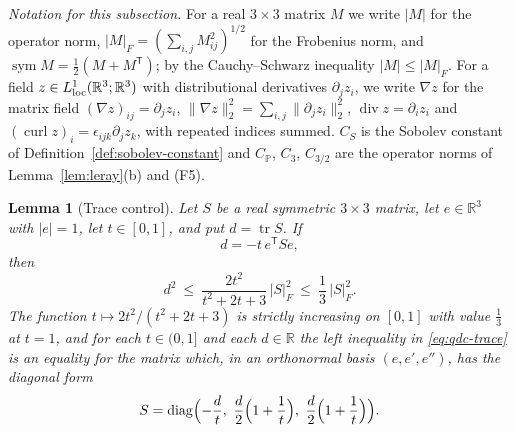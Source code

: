 \documentclass[11pt]{article}
\newtheorem{lemma}[theorem]{Lemma}
\theoremstyle{definition}
\theoremstyle{plain}
\newcommand{\R}{\mathbb R}
\newcommand{\norm}[1]{\lVert #1\rVert}
\begin{document}
\emph{Notation for this subsection.}  For a real $3\times3$ matrix $M$ we
write $|M|$ for the operator norm, $|M|_F=(\sum_{i,j}M_{ij}^2)^{1/2}$ for
the Frobenius norm, and $\operatorname{sym}M=\frac12(M+M^{\mathsf T})$; by
the Cauchy--Schwarz inequality $|M|\le|M|_F$.  For a field
$z\in L^1_{\rm loc}(\R^3;\R^3)$ with distributional derivatives
$\partial_jz_i$, we write $\nabla z$ for the matrix field
$(\nabla z)_{ij}=\partial_jz_i$,
$\norm{\nabla z}_2^2=\sum_{i,j}\norm{\partial_jz_i}_2^2$,
$\operatorname{div}z=\partial_iz_i$ and
$(\operatorname{curl}z)_i=\epsilon_{ijk}\partial_jz_k$, with repeated
indices summed.  $C_S$ is the Sobolev constant of
Definition~\ref{def:sobolev-constant} and $C_{\mathbb P}$, $C_3$, $C_{3/2}$
are the operator norms of Lemma~\ref{lem:leray}(b) and (F5).

\begin{lemma}[Trace control]\label{lem:trace-control}
Let $S$ be a real symmetric $3\times3$ matrix, let $e\in\R^3$ with $|e|=1$,
let $t\in[0,1]$, and put $d=\operatorname{tr}S$.  If
\begin{equation}\label{eq:qdc-constraint}
 d=-t\,e^{\mathsf T}Se ,
\end{equation}
then
\begin{equation}\label{eq:qdc-trace}
 d^2\ \le\ \frac{2t^2}{t^2+2t+3}\,|S|_F^2\ \le\ \frac13\,|S|_F^2 .
\end{equation}
The function $t\mapsto2t^2/(t^2+2t+3)$ is strictly increasing on $[0,1]$
with value $\frac13$ at $t=1$, and for each $t\in(0,1]$ and each $d\in\R$
the left inequality in \eqref{eq:qdc-trace} is an equality for the matrix
which, in an orthonormal basis $(e,e',e'')$, has the diagonal form
\begin{equation}\label{eq:qdc-extremal}
 S=\operatorname{diag}\Bigl(-\frac dt,\ \frac d2\Bigl(1+\frac1t\Bigr),\
 \frac d2\Bigl(1+\frac1t\Bigr)\Bigr).
\end{equation}
\end{lemma}
\end{document}

